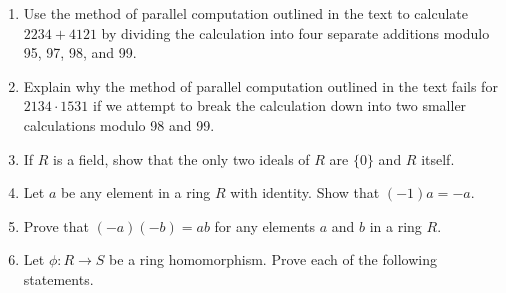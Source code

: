 {\begin{enumerate}
\begin{multicols}{2}
\begin{enumerate}
\item
\begin{align*}
x & \equiv  3 \pmod{7} \\
x & \equiv  0 \pmod{8} \\
x & \equiv  5 \pmod{15} 
\end{align*}

\item
\begin{align*}
x & \equiv  2 \pmod{4} \\
x & \equiv  4 \pmod{7} \\
x & \equiv  7 \pmod{9} \\
x & \equiv  5 \pmod{11} 
\end{align*}

\item
\begin{align*}
x & \equiv  3 \pmod{5} \\
x & \equiv  0 \pmod{8} \\
x & \equiv  1 \pmod{11} \\
x & \equiv  5 \pmod{13} 
\end{align*}


\end{enumerate}
\end{multicols}
 

 
 
 
\item  %
Use the method of parallel computation outlined in the text to
calculate $2234 + 4121$ by dividing the calculation 
into four separate additions modulo 95, 97, 98, and 99. 
 
\item
Explain why the method of parallel computation outlined in the text
fails for $2134 \cdot 1531$ if we attempt to break the calculation
down into two smaller calculations modulo 98 and 99.
 
 
\item
If $R$ is a field,
 show that the only two ideals of $R$ are $\{ 0 \}$
and $R$ itself.
 
 
\item
Let $a$ be any element in a ring $R$ with identity. Show that $(-1)a=
-a$. 
 
 
\item
Prove that $(-a)(-b) = ab$ for any elements $a$ and $b$ in a ring $R$. 
 
  
\item
Let $\phi : R \rightarrow S$ be a ring homomorphism. Prove each of the
following statements. 
\begin{enumerate}
 

\end{enumerate}
\end{enumerate}}
